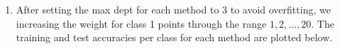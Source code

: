\documentclass{article}
\begin{document}
\begin{enumerate}
\begin{enumerate}
	\item
	After setting the max dept for each method to 3 to avoid overfitting, we increasing the weight for class 1 points through the range $1, 2, \dots, 20$. The training and test accuracies per class for each method are plotted below.
	\begin{figure}[H]
                \centering
        \end{figure}
        \begin{figure}[H]
                \centering

\end{figure}
\end{enumerate}
\end{enumerate}
\end{document}
